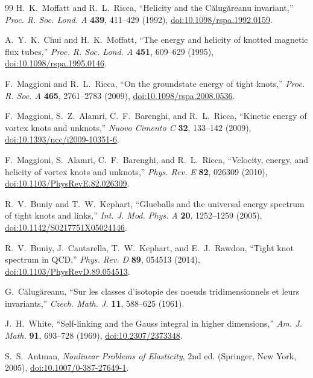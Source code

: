 \documentclass[aps,pre,preprint,notitlepage,nofootinbib,superscriptaddress]{revtex4-2}
\begin{document}
\begin{thebibliography}{99}
H.~K.~Moffatt and R.~L.~Ricca,
``Helicity and the C\u{a}lug\u{a}reanu invariant,''
\emph{Proc. R. Soc. Lond. A} \textbf{439}, 411--429 (1992),
\href{https://doi.org/10.1098/rspa.1992.0159}{doi:10.1098/rspa.1992.0159}.

A.~Y.~K.~Chui and H.~K.~Moffatt,
``The energy and helicity of knotted magnetic flux tubes,''
\emph{Proc. R. Soc. Lond. A} \textbf{451}, 609--629 (1995),
\href{https://doi.org/10.1098/rspa.1995.0146}{doi:10.1098/rspa.1995.0146}.

F.~Maggioni and R.~L.~Ricca,
``On the groundstate energy of tight knots,''
\emph{Proc. R. Soc. A} \textbf{465}, 2761--2783 (2009),
\href{https://doi.org/10.1098/rspa.2008.0536}{doi:10.1098/rspa.2008.0536}.

F.~Maggioni, S.~Z.~Alamri, C.~F.~Barenghi, and R.~L.~Ricca,
``Kinetic energy of vortex knots and unknots,''
\emph{Nuovo Cimento C} \textbf{32}, 133--142 (2009),
\href{https://doi.org/10.1393/ncc/i2009-10351-6}{doi:10.1393/ncc/i2009-10351-6}.

F.~Maggioni, S.~Alamri, C.~F.~Barenghi, and R.~L.~Ricca,
``Velocity, energy, and helicity of vortex knots and unknots,''
\emph{Phys. Rev. E} \textbf{82}, 026309 (2010),
\href{https://doi.org/10.1103/PhysRevE.82.026309}{doi:10.1103/PhysRevE.82.026309}.

R.~V.~Buniy and T.~W.~Kephart,
``Glueballs and the universal energy spectrum of tight knots and links,''
\emph{Int. J. Mod. Phys. A} \textbf{20}, 1252--1259 (2005),
\href{https://doi.org/10.1142/S0217751X05024146}{doi:10.1142/S0217751X05024146}.

R.~V.~Buniy, J.~Cantarella, T.~W.~Kephart, and E.~J.~Rawdon,
``Tight knot spectrum in QCD,''
\emph{Phys. Rev. D} \textbf{89}, 054513 (2014),
\href{https://doi.org/10.1103/PhysRevD.89.054513}{doi:10.1103/PhysRevD.89.054513}.

G.~C\u{a}lug\u{a}reanu,
``Sur les classes d'isotopie des noeuds tridimensionnels et leurs invariants,''
\emph{Czech. Math. J.} \textbf{11}, 588--625 (1961).

J.~H.~White,
``Self-linking and the Gauss integral in higher dimensions,''
\emph{Am. J. Math.} \textbf{91}, 693--728 (1969),
\href{https://doi.org/10.2307/2373348}{doi:10.2307/2373348}.

S.~S.~Antman,
\emph{Nonlinear Problems of Elasticity}, 2nd ed.
(Springer, New York, 2005),
\href{https://doi.org/10.1007/0-387-27649-1}{doi:10.1007/0-387-27649-1}.


\end{thebibliography}
\end{document}
